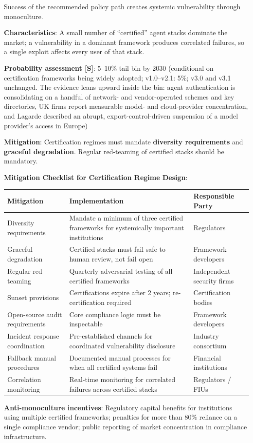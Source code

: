 \documentclass[11pt,letterpaper]{article}
\begin{document}
\begin{warnbox}
Success of the recommended policy path creates systemic vulnerability through monoculture.

\textbf{Characteristics}: A small number of ``certified'' agent stacks dominate the market; a vulnerability in a dominant framework produces correlated failures, so a single exploit affects every user of that stack.

\textbf{Probability assessment [S]}: 5--10\% tail bin by 2030 (conditional on certification frameworks being widely adopted; v1.0--v2.1: 5\%; v3.0 and v3.1 unchanged. The evidence leans upward inside the bin: agent authentication is consolidating on a handful of network- and vendor-operated schemes and key directories, UK firms report measurable model- and cloud-provider concentration, and Lagarde described an abrupt, export-control-driven suspension of a model provider's access in Europe)

\textbf{Mitigation}: Certification regimes must mandate \textbf{diversity requirements} and \textbf{graceful degradation}. Regular red-teaming of certified stacks should be mandatory.

\textbf{Mitigation Checklist for Certification Regime Design}:

\begin{center}
\small
\begin{tabular}{L{3.5cm}L{5cm}L{3.5cm}}
\toprule
\textbf{Mitigation} & \textbf{Implementation} & \textbf{Responsible Party} \\
\midrule
Diversity requirements & Mandate a minimum of three certified frameworks for systemically important institutions & Regulators \\
Graceful degradation & Certified stacks must fail safe to human review, not fail open & Framework developers \\
Regular red-teaming & Quarterly adversarial testing of all certified frameworks & Independent security firms \\
Sunset provisions & Certifications expire after 2 years; re-certification required & Certification bodies \\
Open-source audit requirements & Core compliance logic must be inspectable & Framework developers \\
Incident response coordination & Pre-established channels for coordinated vulnerability disclosure & Industry consortium \\
Fallback manual procedures & Documented manual processes for when all certified systems fail & Financial institutions \\
Correlation monitoring & Real-time monitoring for correlated failures across certified stacks & Regulators / FIUs \\
\bottomrule
\end{tabular}
\end{center}

\textbf{Anti-monoculture incentives}: Regulatory capital benefits for institutions using multiple certified frameworks; penalties for more than 80\% reliance on a single compliance vendor; public reporting of market concentration in compliance infrastructure.
\end{warnbox}
\end{document}
